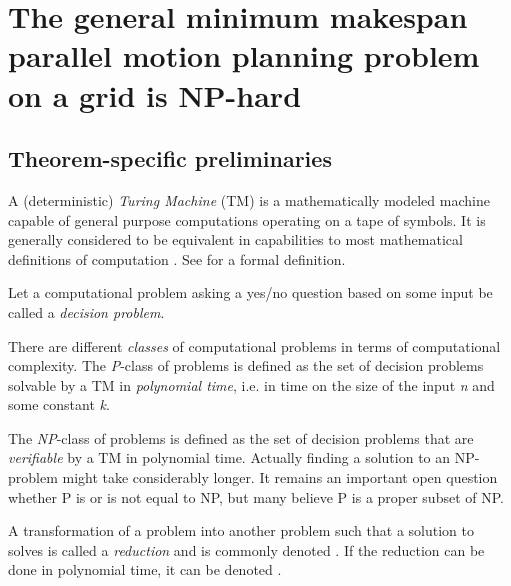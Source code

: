 \section{The general minimum makespan parallel motion planning problem on a grid is NP-hard}\label{chapter:main_proof}

\cite{siamcomp/DemaineFKMS19} \cite{corr/YuL15c}

\subsection{Theorem-specific preliminaries}

A (deterministic) \emph{Turing Machine} (TM) is a mathematically modeled machine capable of general purpose computations operating on a tape of symbols. It is generally considered to be equivalent in capabilities to most mathematical definitions of computation \cite{aw/HopcroftU79}. See \cite{aw/HopcroftU79} for a formal definition. 

Let a computational problem asking a yes/no question based on some input be called a \emph{decision problem}.

There are different \emph{classes} of computational  problems in terms of computational complexity. The \emph{P}-class of problems is defined as the set of decision problems solvable by a TM in \emph{polynomial time}, i.e.  in  time on the size of the input \emph{n} and some constant \emph{k}.

The \emph{NP}-class of problems is defined as the set of decision problems that are \emph{verifiable} by a TM in polynomial time. Actually finding a solution to an NP-problem might take considerably longer. It remains an important open question whether P is or is not equal to NP, but many believe P is a proper subset of NP.

A transformation of a problem  into another problem   such that a solution to  solves  is called a \emph{reduction} and is commonly denoted . If the reduction can be done in polynomial time, it can be denoted  .

